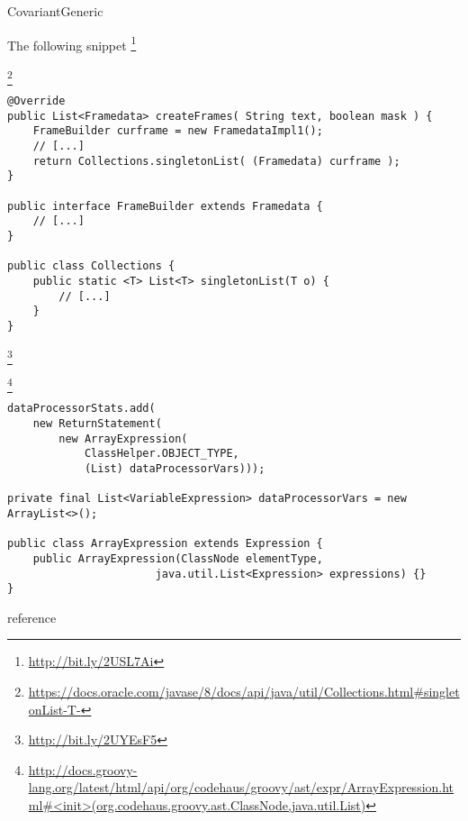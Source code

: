 \begin{pattern}{CovariantGeneric}

\instances{}
The following snippet%
\footnote{\url{http://bit.ly/2USL7Ai}}

\footnote{\url{https://docs.oracle.com/javase/8/docs/api/java/util/Collections.html\#singletonList-T-}}

\begin{verbatim}
@Override
public List<Framedata> createFrames( String text, boolean mask ) {
    FrameBuilder curframe = new FramedataImpl1();
    // [...]
    return Collections.singletonList( (Framedata) curframe );
}

public interface FrameBuilder extends Framedata {
    // [...]
}

public class Collections {
    public static <T> List<T> singletonList(T o) {
        // [...]
    }
}
\end{verbatim}

\footnote{\url{http://bit.ly/2UYEsF5}}

\footnote{\url{http://docs.groovy-lang.org/latest/html/api/org/codehaus/groovy/ast/expr/ArrayExpression.html\#<init>(org.codehaus.groovy.ast.ClassNode,java.util.List)}}

\begin{verbatim}
dataProcessorStats.add(
    new ReturnStatement(
        new ArrayExpression(
            ClassHelper.OBJECT_TYPE,
            (List) dataProcessorVars)));

private final List<VariableExpression> dataProcessorVars = new ArrayList<>();

public class ArrayExpression extends Expression {
    public ArrayExpression(ClassNode elementType,
                       java.util.List<Expression> expressions) {}
}
\end{verbatim}


\detection{}

\discussion{}

reference \cite{altidorTamingWildcardsCombining2011}

\related{}

\end{pattern}